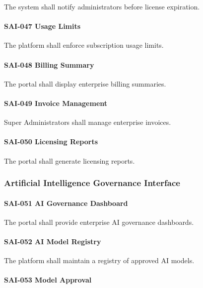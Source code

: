 The system shall notify administrators before license expiration.

\paragraph{SAI-047 Usage Limits}

The platform shall enforce subscription usage limits.

\paragraph{SAI-048 Billing Summary}

The portal shall display enterprise billing summaries.

\paragraph{SAI-049 Invoice Management}

Super Administrators shall manage enterprise invoices.

\paragraph{SAI-050 Licensing Reports}

The portal shall generate licensing reports.


\subsubsection*{Artificial Intelligence Governance Interface}

\paragraph{SAI-051 AI Governance Dashboard}

The portal shall provide enterprise AI governance dashboards.

\paragraph{SAI-052 AI Model Registry}

The platform shall maintain a registry of approved AI models.

\paragraph{SAI-053 Model Approval}

